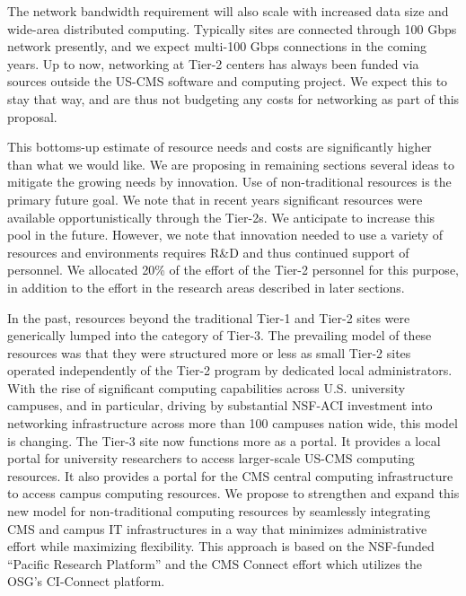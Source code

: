 \documentclass[11pt,a4paper]{article}
\begin{document}
The network bandwidth requirement will also scale with increased data
size and wide-area distributed computing.  Typically sites are
connected through 100 Gbps network presently, and we expect
multi-100 Gbps connections in the coming years. Up to now, networking at Tier-2 centers has always been funded
via sources outside the US-CMS software and computing project. We expect this to stay that way, and are thus not budgeting
any costs for networking as part of this proposal.

This bottoms-up estimate of resource needs and costs are significantly
higher than what we would like. We are proposing in remaining sections
several ideas to mitigate the growing needs by innovation.  Use of
non-traditional resources is the primary future goal.  We note that
in recent years significant resources were available opportunistically
through the Tier-2s.  We anticipate to increase this pool in the future.
However, we note that innovation needed to use a variety of resources
and environments requires R\&D and thus continued support of  personnel.
We allocated 20\% of the effort of the Tier-2 personnel for this
purpose, in addition to the effort in the research areas described
in later sections.


In the past, resources beyond the traditional Tier-1 and Tier-2 sites were generically lumped into the category of Tier-3.  The prevailing model of these resources was that they were structured more or less as small Tier-2 sites operated independently of the Tier-2 program by dedicated local administrators.  With the rise of significant computing capabilities across U.S. university campuses, and in particular, driving by substantial NSF-ACI investment into networking infrastructure across more than 100 campuses nation wide, this model is changing.  The Tier-3 site now functions more as a portal.  It provides a local portal for university researchers to access larger-scale US-CMS computing resources.  It also provides a portal for the CMS central computing infrastructure to access campus computing resources.  We propose to strengthen and expand this new model for non-traditional computing resources by seamlessly integrating CMS and campus IT infrastructures in a way that minimizes administrative effort while maximizing flexibility.  This approach is based on the NSF-funded ``Pacific Research Platform'' and the CMS Connect effort which utilizes the OSG's CI-Connect platform.
\end{document}
